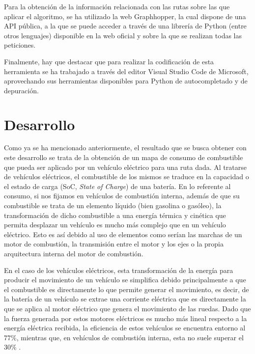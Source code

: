 \documentclass[11pt,spanish,listoffigures,listoftables]{tfgetsinf}
\begin{document}
Para la obtención de la información relacionada con las rutas sobre las que aplicar el algoritmo, se ha utilizado la web Graphhopper, la cual dispone de una API pública, a la que se puede acceder a través de una librería de Python (entre otros lenguajes) disponible en la web oficial y sobre la que se realizan todas las peticiones. 

Finalmente, hay que destacar que para realizar la codificación de esta herramienta se ha trabajado a través del editor Visual Studio Code de Microsoft, aprovechando sus herramientas disponibles para Python de autocompletado y de depuración.


\chapter{Desarrollo}
Como ya se ha mencionado anteriormente, el resultado que se busca obtener con este desarrollo se trata de la obtención de un mapa de consumo de combustible que pueda ser aplicado por un vehículo eléctrico para una ruta dada. Al tratarse de vehículos eléctricos, el combustible de los mismos se traduce en la capacidad o el estado de carga (SoC, \textit{State of Charge}) de una batería. En lo referente al consumo, si nos fijamos en vehículos de combustión interna, además de que su combustible se trata de un elemento líquido (bien gasolina o gasóleo), la transformación de dicho combustible a una energía térmica y cinética que permita desplazar un vehículo es mucho más complejo que en un vehículo eléctrico. Esto es así debido al uso de elementos como serían las marchas de un motor de combustión, la transmisión entre el motor y los ejes o la propia arquitectura interna del motor de combustión.

En el caso de los vehículos eléctricos, esta transformación de la energía para producir el movimiento de un vehículo se simplifica debido principalmente a que el combustible es directamente lo que permite generar el movimiento, es decir, de la batería de un vehículo se extrae una corriente eléctrica que es directamente la que se aplica al motor eléctrico que genera el movimiento de las ruedas. Dado que la fuerza generada por estos motores eléctricos es mucho más lineal respecto a la energía eléctrica recibida, la eficiencia de estos vehículos se encuentra entorno al 77\%, mientras que, en vehículos de combustión interna, esta no suele superar el 30\% \cite{MILLER2011}.
\end{document}
